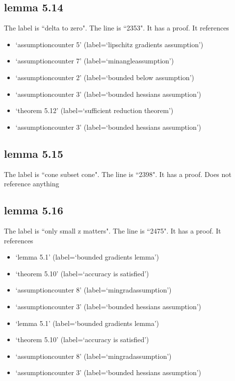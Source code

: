 \documentclass{article}
\begin{document}
\subsection{lemma 5.14}
The label is ``delta to zero".
The line is ``2353".
It has a proof.
It references \begin{itemize}
\item `assumptioncounter 5' (label=`lipschitz gradients assumption')
\item `assumptioncounter 7' (label=`minangleassumption')
\item `assumptioncounter 2' (label=`bounded below assumption')
\item `assumptioncounter 3' (label=`bounded hessians assumption')
\item `theorem 5.12' (label=`sufficient reduction theorem')
\item `assumptioncounter 3' (label=`bounded hessians assumption')
\end{itemize}
\subsection{lemma 5.15}
The label is ``cone subset cone".
The line is ``2398".
It has a proof.
Does not reference anything
\subsection{lemma 5.16}
The label is ``only small z matters".
The line is ``2475".
It has a proof.
It references \begin{itemize}
\item `lemma 5.1' (label=`bounded gradients lemma')
\item `theorem 5.10' (label=`accuracy is satisfied')
\item `assumptioncounter 8' (label=`mingradassumption')
\item `assumptioncounter 3' (label=`bounded hessians assumption')
\item `lemma 5.1' (label=`bounded gradients lemma')
\item `theorem 5.10' (label=`accuracy is satisfied')
\item `assumptioncounter 8' (label=`mingradassumption')
\item `assumptioncounter 3' (label=`bounded hessians assumption')
\end{itemize}
\end{document}
